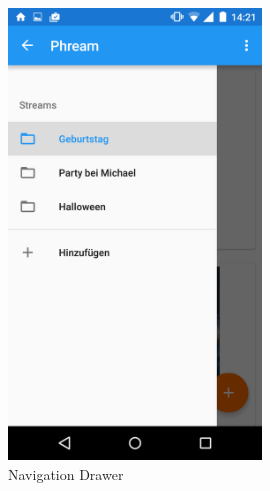 \begin{figure}[H]
\centering
	\begin{minipage}{0.4\textwidth} 
	\centering
	\includegraphics[width=0.6\textwidth]{images/screenshots/navigationdrawer.png}
	\caption{Navigation Drawer}
	\label{label:navigationdrawer}
	\end{minipage}
\end{figure}

